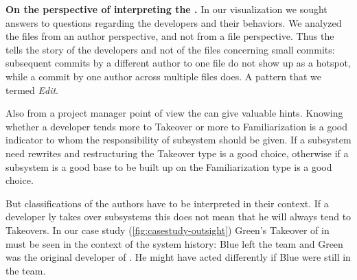 \textbf{On the perspective of interpreting the \omap.} In our visualization we sought answers to questions regarding the developers and their behaviors. We analyzed the files from an author perspective, and not from a file perspective. Thus the \omap tells the story of the developers and not of the files \eg concerning small commits: subsequent commits by a different author to one file do not show up as a hotspot, while a commit by one author across multiple files does. A pattern that we termed \textit{Edit}.

Also from a project manager point of view the \omap can give valuable hints. Knowing whether a developer tends more to  Takeover or more to Familiarization is a good indicator to whom the responsibility of subsystem should be given. If a subsystem need rewrites and restructuring the Takeover type is a good choice, otherwise if a subsystem is a good base to be built up on the Familiarization type is a good choice.

But classifications of the authors have to be interpreted in their context. If a developer ly takes over subsystems this does not mean that he will always tend to Takeovers. In our case study (\autoref{fig:casestudy-outsight}) Green's Takeover of  in  must be seen in the context of the system history: Blue left the team and Green was the original developer of . He might have acted differently if Blue were still in the team.

%
%
%

